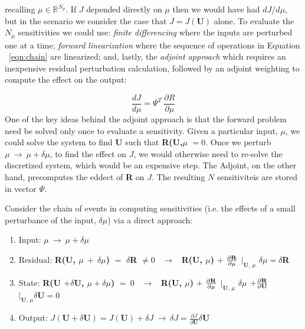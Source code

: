 recalling $\mu \in \mathbb{R}^{N_p}$. If $J$ depended directly on $\mu$ then we would have had ${dJ}/{d\mu}$, but in the scenario we consider the case that $J = J(\mathbf{U})$ alone. To evaluate the $N_\mu$ sensitivities we could use: \textit{finite differencing} where the inputs are  perturbed one at a time;  \textit{forward linearization} where the sequence of operations in Equation ~\eqref{eqn:chain} are linearized; and, lastly, the \textit{adjoint approach} which requires an inexpensive residual perturbation calculation, followed by an adjoint weighting to compute the effect on the output:\par
\begin{equation}
\frac{dJ}{d\mu} = \Psi^T ~\frac{\partial R}{\partial \mu}
\end{equation}
One of the key ideas behind the adjoint approach is that the forward problem need be solved only once to evaluate a sensitivity. Given a particular input, $\mu$, we could solve the system to find \textbf{U} such that \textbf{R(U,$\mu$} $ = 0$. Once we perturb $\mu ~\to~ \mu + \delta \mu$, to find the effect on $J$, we would otherwise need to re-solve the discretized system, which would be an expensive step. The Adjoint, on the other hand, precomputes the eddect of \textbf{R} on $J$. The resulting $N$ sensitiviteis are stored in vector $\Psi$.\par

Consider the chain of events in computing sensitivities (i.e. the effects of a small perturbance of the input, $\delta \mu$) via a direct approach:
\begin{enumerate}
\item Input:  $\mu ~\to~ \mu + \delta \mu$
\item Residual: \textbf{R(U, $\mu ~+~ \delta \mu$)} $=$ $\delta$\textbf{R} $\neq 0$ ~$\to$~ \textbf{R(U, $\mu$)} $+$ $\frac{\partial \text{\textbf{R}}}{\partial \mu}$ $\bigg|_{\textbf{U, $\mu$}}$ $\delta \mu = \delta$\textbf{R}
\item State: \textbf{R(U $+ \delta$U, $ \mu + \delta\mu$)} $= ~0$ ~$\to$~ \textbf{R(U, $\mu$)} $+$ $\frac{\partial \text{\textbf{R}}}{\partial \mu}$ $\bigg|_{\textbf{U, $\mu$}}$ $\delta \mu$ $ + \frac{\partial \text{\textbf{R}}}{\partial \text{\textbf{U}}}$     $\bigg|_{\textbf{U, $\mu$}} \delta \mathbf{U}  = 0$
\item Output: $J(\textbf{U} + \delta \textbf{U}) = J(\textbf{U}) + \delta J ~\to~ \delta J = \frac{\partial J}{\partial \textbf{U}} \delta \mathbf{U} $
\end{enumerate}

